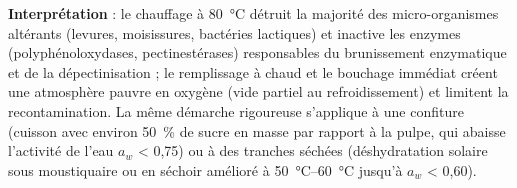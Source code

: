 \documentclass[11pt]{article}
\begin{document}
\begin{experience}
\textbf{Interprétation} : le chauffage à \SI{80}{\celsius} détruit la majorité des micro-organismes altérants (levures, moisissures, bactéries lactiques) et inactive les enzymes (polyphénoloxydases, pectinestérases) responsables du brunissement enzymatique et de la dépectinisation ; le remplissage à chaud et le bouchage immédiat créent une atmosphère pauvre en oxygène (vide partiel au refroidissement) et limitent la recontamination. La même démarche rigoureuse s'applique à une confiture (cuisson avec environ \SI{50}{\percent} de sucre en masse par rapport à la pulpe, qui abaisse l'activité de l'eau $a_w$ \textless{} 0,75) ou à des tranches séchées (déshydratation solaire sous moustiquaire ou en séchoir amélioré à \SIrange{50}{60}{\celsius} jusqu'à $a_w$ \textless{} 0,60).
\end{experience}
\end{document}
